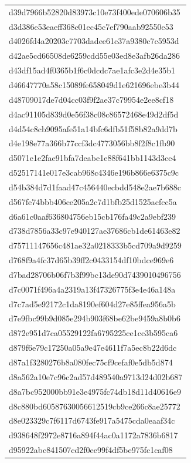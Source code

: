 \begin{tabular}{l}
d39d7966b52820d83973c10e73f400ede070606b35 \\
d3d386e53eaeff368c01ec45c7ef790aab92550e53 \\
d4026fd4a20203c7703dadee61c37a9380c7c5953d \\
d42ae5cd66508de6259cdd55e03ed8e3afb26da286 \\
d43df15ad4f0365b1f6c0dcdc7ae1afc3e2d4e35b1 \\
d46647770a58c15089fe658049d1e621696ebe3b44 \\
d48709017de7d04cc03f9f2ae37c79954e2ee8cf18 \\
d4ac91105d839d0e56f38c08c86572468e49d2df5d \\
d4d54c8cb9095afe51a14bfc6dfb51f58b82a9dd7b \\
d4e198e77a366b77ccf3dc4773056bb8f2f8c1fb90 \\
d5071e1e2fae91bfa7deabe1e88f641bb1143d3ce4 \\
d52517141e017e3cab968c4346e196b866e6375c9c \\
d54b384d7d1faad47c456440ecbdd548e2ae7b688c \\
d567fe74bbb406ce205a2c7d1bfb25d1525acfcc5a \\
d6a61c0aaf636804756eb15cb176fa49c2a9ebf239 \\
d738d7856a33c97e940127ae37686cb1de61463e82 \\
d75711147656c481ae32a0218333b5cd709a9d9259 \\
d768f9a4fc37d65b39ff2c0433154df10bdce969e6 \\
d7bad28706b06f7b3f99bc13de90d7439010496756 \\
d7c0071f496a4a2319a13f47326775f3e4e46a148a \\
d7c7ad5e92172c1da8190ef604d27e85ffea956a5b \\
d7e9fbc99b9d085e294b903f68be62be9459a8b0b6 \\
d872e951d7ca05529122fa6795225ce1cc3b595ca6 \\
d879f6e79c17250a05a9e47e4611f7a5ec8b22d6dc \\
d87a1f3280276b8a080fec75cf9cefaf0e5db5d874 \\
d8a562a10e7c96c2ad57d489540a9713d24d02b687 \\
d8a7bc952000bb91e3e4975fc74db18d11d40616e9 \\
d8c880bd60587630056612519cb9ce266c8ae25772 \\
d8e023329c7f6117d6743fe917a5475cda0eaaf34c \\
d938648f2972e8716a894f44ac0a1172a7836b6817 \\
d95922abc841507cd2f0ee99f4df5be975fc1caf08 \\

\end{tabular}
